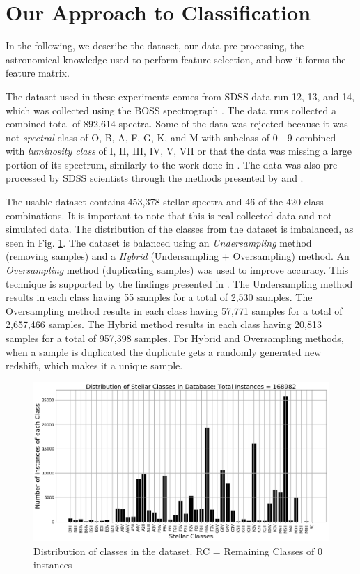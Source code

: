 \documentclass[./AutomatedMK.tex]{subfiles}
\begin{document}
\section{Our Approach to Classification}\label{sec:Approach_B}
	In the following, we describe the dataset, our data pre-processing, the astronomical knowledge used to perform feature selection, and how it forms the feature matrix.

The dataset used in these experiments comes from SDSS data run 12, 13, and 14, which was collected using the BOSS spectrograph \citep{Smee, boss}. The data runs collected a combined total of 892,614 spectra. Some of the data was rejected because it was not \textit{spectral} class of O, B, A, F, G, K, and M with subclass of 0 - 9 combined with \textit{luminosity class} of I, II, III, IV, V, VII or that the data was missing a large portion of its spectrum, similarly to the work done in \citeauthor{brice}. The data was also pre-processed by SDSS scientists through the methods presented by \citeauthor{Dawson} and \citeauthor{Stoughton}.

The usable dataset contains 453,378 stellar spectra and 46 of the 420 class combinations. It is important to note that this is real collected data and not simulated data. The distribution of the classes from the dataset is imbalanced, as seen in Fig. \ref{fig:dist_B}. The dataset is balanced using an \textit{Undersampling} method (removing samples) \citep{Japkowicz} and a \textit{Hybrid} (Undersampling + Oversampling) method. An \textit{Oversampling} method (duplicating samples) was used to improve accuracy. This technique is supported by the findings presented in \cite{brice}. The Undersampling method results in each class having 55 samples for a total of 2,530 samples. The Oversampling method results in each class having 57,771 samples for a total of 2,657,466 samples. The Hybrid method results in each class having 20,813 samples for a total of 957,398 samples. For Hybrid and Oversampling methods, when a sample is duplicated the duplicate gets a randomly generated new redshift, which makes it a unique sample.

        \begin{figure}
            \centering
            \includegraphics[width=0.5\linewidth]{figures/Distribution_B.png}
            \caption{Distribution of classes in the dataset. RC = Remaining Classes of 0 instances}
            \label{fig:dist_B}
        \end{figure}
\end{document}
